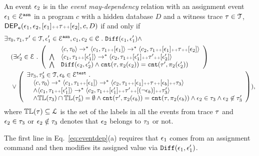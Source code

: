 \begin{defn}
\label{def:event_dep}
An event $\mathtt{\epsilon}_2$ is in the \emph{event may-dependency} relation with an assignment event $\mathtt{\epsilon}_1 \in \mathcal{E}^{\mathtt{{asn}}}$ in a program ${c}$  with a hidden database $D$ and a witness trace $\mathtt{\tau} \in \mathcal{T}$,
$\mathsf{DEP_{\mathtt{e}}}(\mathtt{\epsilon}_1, \mathtt{\epsilon}_2, [\mathtt{\epsilon}_1 ] {\scriptscriptstyle ++} \mathtt{\tau} {\scriptscriptstyle ++} [\mathtt{\epsilon}_2], c, D)$ if and only if
\begin{subequations}
\begin{align}
&  
\exists \trace_0, \trace_1, \trace' \in \mathcal{T},\event_1' \in \eventset^{\asn}, {c}_1, {c}_2  \in \cdom  \st \diff(\event_1, \event_1') \land \\
& 
\quad (\exists  \event_2' \in \eventset \st 
\left(
\begin{array}{ll}   
  & \config{{c}, \trace_0} \rightarrow^{*} 
  \config{{c}_1, \trace_1 \tracecat [\event_1]}  \rightarrow^{*} 
  \config{{c}_2,  \trace_1 \tracecat [\event_1] \tracecat \trace \tracecat [\event_2] } 
   \\ 
   \bigwedge &
   \config{{c}_1, \trace_1 \tracecat [\event_1']}  \rightarrow^{*}
    \config{{c}_2,  \trace_1 \tracecat[ \event_1'] \tracecat \trace' \tracecat [\event_2'] } 
  \\
  \bigwedge & 
  \diff(\event_2,\event_2' ) \land 
  \vcounter(\trace, \pi_2(\event_2))
  = 
  \vcounter(\trace', \pi_2(\event_2'))\\
  \end{array}
  \right)\\ 
  & 
  \quad
  \lor 
  \left(
  \begin{array}{l} 
  \exists \trace_3, \trace_3'  \in \mathcal{T}, \event_b \in \eventset^{\test} \st 
  \\
   \quad \config{{c}, \trace_0} \rightarrow^{*} \config{{c}_1, \trace_1 \tracecat [\event_1]}  \rightarrow^{*}
   \config{c_2,  \trace_1 \tracecat [\event_1] \tracecat
   \trace \tracecat [\event_b] \tracecat  \trace_3} 
\\ \quad \land
\config{{c}_1, \trace_1 \tracecat [\event_1']}  \rightarrow^{*} 
\config{c_2,  \trace_1 \tracecat [\event_1'] \tracecat \trace' \tracecat [(\neg \event_b)] \tracecat \trace_3'} 
\\
\quad \land \tlabel({\trace_3}) \cap \tlabel({\trace_3'})
= \emptyset
\land \vcounter(\trace', \pi_2(\event_b)) = \vcounter(\trace, \pi_2(\event_b)) 
    \land \event_2 \in \trace_3
    \land \event_2 \not\in \trace_3'
  \end{array}
  \right)
  ),
\end{align}
\label{eq:eventdep}
\end{subequations}
where $\mathbb{TL}(\mathtt{\tau}) \subseteq \mathcal{L}$ is the set of the labels in all the events from trace $\mathtt{\tau}$ and $\mathtt{\epsilon}_2 \in \mathtt{\tau}_3$ or $\mathtt{\epsilon}_2 \notin \mathtt{\tau}_3$ denotes that $\mathtt{\epsilon}_2$ belongs to $\mathtt{\tau}_3$ or not.
\end{defn}
The first line in Eq.~\ref{eq:eventdep}(a) requires that $\mathtt{\epsilon}_1$ comes from an assignment command and then modifies its assigned value via $\mathtt{Diff}(\mathtt{\epsilon}_1, \mathtt{\epsilon}_1')$.

